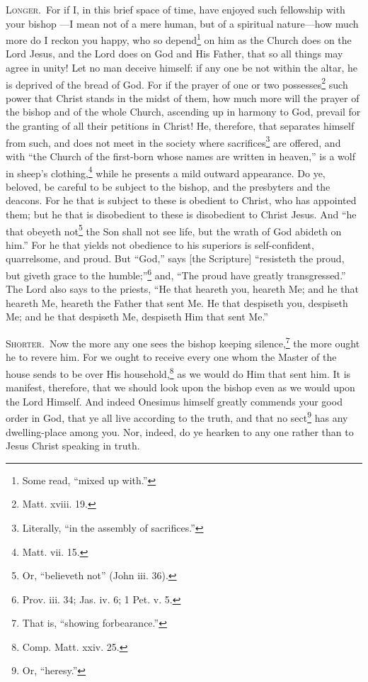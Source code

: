 \textsc{Longer.}~For if I, in this brief space of time, have enjoyed such fellowship with your bishop —I mean not of a mere human, but of a spiritual nature—how much more do I reckon you happy, who so depend\footnote{Some read, “mixed up with.”} on him as the Church does on the Lord Jesus, and the Lord does on God and His Father, that so all things may agree in unity! Let no man deceive himself: if any one be not within the altar, he is deprived of the bread of God. For if the prayer of one or two possesses\footnote{Matt. xviii. 19.} such power that Christ stands in the midst of them, how much more will the prayer of the bishop and of the whole Church, ascending up in harmony to God, prevail for the granting of all their petitions in Christ! He, therefore, that separates himself from such, and does not meet in the society where sacrifices\footnote{Literally, “in the assembly of sacrifices.”} are offered, and with “the Church of the first-born whose names are written in heaven,” is a wolf in sheep’s clothing,\footnote{Matt. vii. 15.} while he presents a mild outward appearance. Do ye, beloved, be careful to be subject to the bishop, and the presbyters and the deacons. For he that is subject to these is obedient to Christ, who has appointed them; but he that is disobedient to these is disobedient to Christ Jesus. And “he that obeyeth not\footnote{Or, “believeth not” (John iii. 36).} the Son shall not see life, but the wrath of God abideth on him.” For he that yields not obedience to his superiors is self-confident, quarrelsome, and proud. But “God,” says [the Scripture] “resisteth the proud, but giveth grace to the humble;”\footnote{Prov. iii. 34; Jas. iv. 6; 1 Pet. v. 5.} and, “The proud have greatly transgressed.” The Lord also says to the priests, “He that heareth you, heareth Me; and he that heareth Me, heareth the Father that sent Me. He that despiseth you, despiseth Me; and he that despiseth Me, despiseth Him that sent Me.”


\textsc{Shorter.}~Now the more any one sees the bishop keeping silence,\footnote{That is, “showing forbearance.”} the more ought he to revere him. For we ought to receive every one whom the Master of the house sends to be over His household,\footnote{Comp. Matt. xxiv. 25.} as we would do Him that sent him. It is manifest, therefore, that we should look upon the bishop even as we would upon the  Lord Himself. And indeed Onesimus himself greatly commends your good order in God, that ye all live according to the truth, and that no sect\footnote{Or, “heresy.”} has any dwelling-place among you. Nor, indeed, do ye hearken to any one rather than to Jesus Christ speaking in truth.

